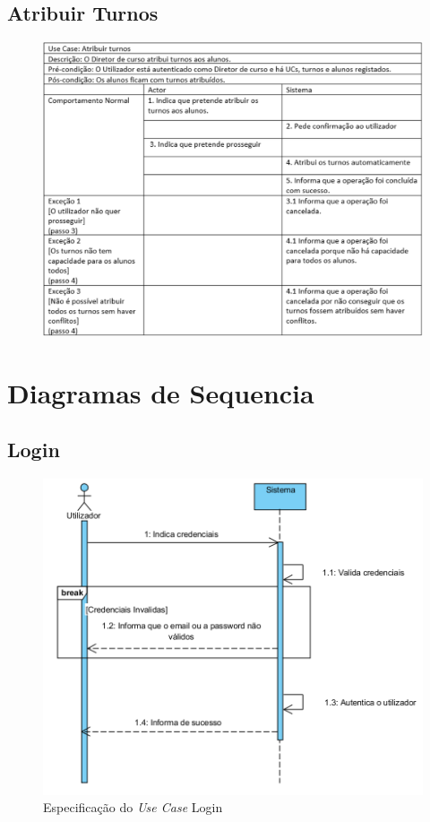 \documentclass[12pt,a4paper]{report}
\begin{document}
\begin{appendices}
\section{Atribuir Turnos}
\begin{figure}[H]
	\centering 
	\includegraphics[width=\textwidth]{modelacao/especificacao_use_case/atribuirturnos.png}  
\end{figure}

\chapter{Diagramas de Sequencia}
\section{Login}
\begin{figure}[H]
	\centering 
	\includegraphics[width=\textwidth]{modelacao/use_case_diagram/Login.png}  
	\caption{Especificação do \emph{Use Case} Login}
\end{figure}

\end{appendices}
\end{document}
